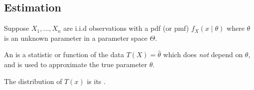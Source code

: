 \documentclass[a4paper]{scrartcl}
\begin{document}





\subsection{Estimation}

Suppose $X_1, \dots, X_n$ are i.i.d observations with a pdf (or pmf)
$
f_X(x \mid \theta)
$
where $\theta$ is an unknown parameter in a parameter space $\Theta$.

\begin{definition}[Estimator]
An  is a statistic or function of the data $T(X) = \hat{\theta}$ which does \emph{not} depend on $\theta$, and is used to approximate the true parameter $\theta$.
\end{definition}


The distribution of $T(x)$ is its .
\end{document}
